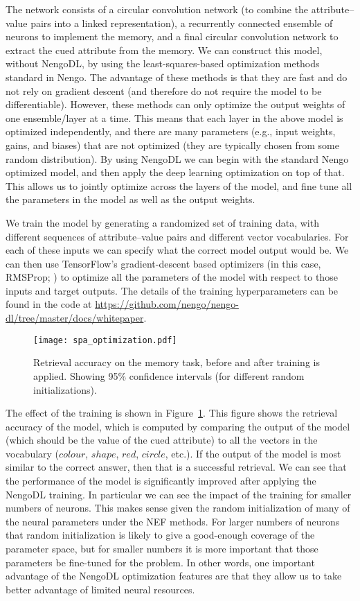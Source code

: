 \documentclass{article}
\begin{document}
The network consists of a circular convolution network (to combine the attribute--value pairs into a linked representation), a recurrently connected ensemble of neurons to implement the memory, and a final circular convolution network to extract the cued attribute from the memory.  We can construct this model, without NengoDL, by using the  least-squares-based optimization methods standard in Nengo.  The advantage of these methods is that they are fast and do not rely on gradient descent (and therefore do not require the model to be differentiable).  However, these methods can only optimize the output weights of one ensemble/layer at a time.  This means that each layer in the above model is optimized independently, and there are many parameters (e.g., input weights, gains, and biases) that are not optimized (they are typically chosen from some random distribution).  By using NengoDL we can begin with the standard Nengo optimized model, and then apply the deep learning optimization on top of that.  This allows us to jointly optimize across the layers of the model, and fine tune all the parameters in the model as well as the output weights.

We train the model by generating a randomized set of training data, with different sequences of attribute--value pairs and different vector vocabularies.  For each of these inputs we can specify what the correct model output would be.  We can then use TensorFlow's gradient-descent based optimizers (in this case, RMSProp; \citealt{Tieleman2012}) to optimize all the parameters of the model with respect to those inputs and target outputs.  The details of the training hyperparameters can be found in the code at \url{https://github.com/nengo/nengo-dl/tree/master/docs/whitepaper}.

\begin{figure}
\centering
\texttt{[image: spa\_optimization.pdf]}
\caption{Retrieval accuracy on the memory task, before and after training is applied.  Showing 95\% confidence intervals (for different random initializations).}
\label{fig:spa_optimization}
\end{figure}

The effect of the training is shown in Figure~\ref{fig:spa_optimization}.  This figure shows the retrieval accuracy of the model, which is computed by comparing the output of the model (which should be the value of the cued attribute) to all the vectors in the vocabulary ($colour$, $shape$, $red$, $circle$, etc.).  If the output of the model is most similar to the correct answer, then that is a successful retrieval.  We can see that the performance of the model is significantly improved after applying the NengoDL training.  In particular we can see the impact of the training for smaller numbers of neurons.  This makes sense given the random initialization of many of the neural parameters under the NEF methods. For larger numbers of neurons that random initialization is likely to give a good-enough coverage of the parameter space, but for smaller numbers it is more important that those parameters be fine-tuned for the problem.  In other words, one important advantage of the NengoDL optimization features are that they allow us to take better advantage of limited neural resources.
\end{document}
